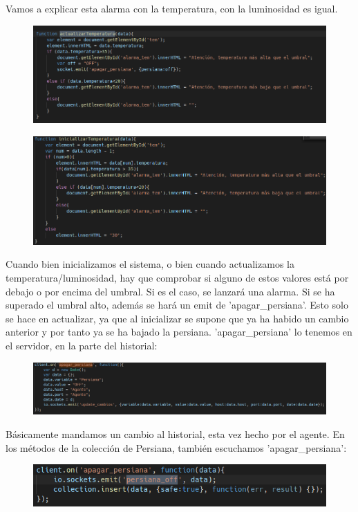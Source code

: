 \documentclass{article}
\begin{document}
	Vamos a explicar esta alarma con la temperatura, con la luminosidad es igual.
	\begin{figure}[H]
		\centering
		\includegraphics[totalheight=4.5cm]{img/33.png}
	\end{figure}
	\begin{figure}[H]
		\centering
		\includegraphics[totalheight=5cm]{img/34.png}
	\end{figure}
	Cuando bien inicializamos el sistema, o bien cuando actualizamos la temperatura/luminosidad, hay que comprobar si alguno de estos valores está por debajo o por encima del umbral. Si es el caso, se lanzará una alarma. Si se ha superado el umbral alto, además se hará un emit de 'apagar\_persiana'. Esto solo se hace en actualizar, ya que al inicializar se supone que ya ha habido un cambio anterior y por tanto ya se ha bajado la persiana. 'apagar\_persiana' lo tenemos en el servidor, en la parte del historial:
	\begin{figure}[H]
		\centering
		\includegraphics[totalheight=2.25cm]{img/35.png}
	\end{figure}
	Básicamente mandamos un cambio al historial, esta vez hecho por el agente. En los métodos de la colección de Persiana, también escuchamos 'apagar\_persiana':
	\begin{figure}[H]
		\centering
		\includegraphics[totalheight=1.85cm]{img/36.png}
	\end{figure}
\end{document}

